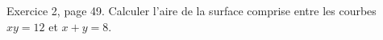 \begin{exercice}\label{exo0023}

Exercice 2, page 49. Calculer l'aire de la surface comprise entre les courbes $xy=12$ et $x+y=8$.

\end{exercice}

